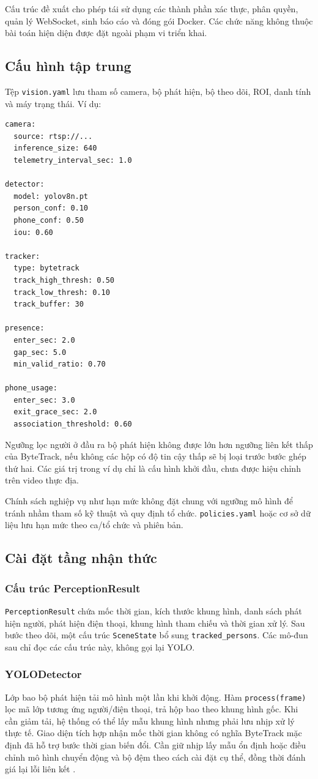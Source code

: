 Cấu trúc đề xuất cho phép tái sử dụng các thành phần xác thực, phân quyền, quản lý WebSocket, sinh báo cáo và đóng gói Docker. Các chức năng không thuộc bài toán hiện diện được đặt ngoài phạm vi triển khai.

\subsection{Cấu hình tập trung}
Tệp \texttt{vision.yaml} lưu tham số camera, bộ phát hiện, bộ theo dõi, ROI, danh tính và máy trạng thái. Ví dụ:
\begin{Verbatim}[fontsize=\small,breaklines=true,breakanywhere=true]
camera:
  source: rtsp://...
  inference_size: 640
  telemetry_interval_sec: 1.0

detector:
  model: yolov8n.pt
  person_conf: 0.10
  phone_conf: 0.50
  iou: 0.60

tracker:
  type: bytetrack
  track_high_thresh: 0.50
  track_low_thresh: 0.10
  track_buffer: 30

presence:
  enter_sec: 2.0
  gap_sec: 5.0
  min_valid_ratio: 0.70

phone_usage:
  enter_sec: 3.0
  exit_grace_sec: 2.0
  association_threshold: 0.60
\end{Verbatim}
Ngưỡng lọc người ở đầu ra bộ phát hiện không được lớn hơn ngưỡng liên kết thấp của ByteTrack, nếu không các hộp có độ tin cậy thấp sẽ bị loại trước bước ghép thứ hai. Các giá trị trong ví dụ chỉ là cấu hình khởi đầu, chưa được hiệu chỉnh trên video thực địa.

Chính sách nghiệp vụ như hạn mức không đặt chung với ngưỡng mô hình để tránh nhầm tham số kỹ thuật và quy định tổ chức. \texttt{policies.yaml} hoặc cơ sở dữ liệu lưu hạn mức theo ca/tổ chức và phiên bản.

\subsection{Cài đặt tầng nhận thức}
\subsubsection{Cấu trúc PerceptionResult}
\texttt{PerceptionResult} chứa mốc thời gian, kích thước khung hình, danh sách phát hiện người, phát hiện điện thoại, khung hình tham chiếu và thời gian xử lý. Sau bước theo dõi, một cấu trúc \texttt{SceneState} bổ sung \texttt{tracked\_persons}. Các mô-đun sau chỉ đọc các cấu trúc này, không gọi lại YOLO.

\subsubsection{YOLODetector}
Lớp bao bộ phát hiện tải mô hình một lần khi khởi động. Hàm \texttt{process(frame)} lọc mã lớp tương ứng người/điện thoại, trả hộp bao theo khung hình gốc. Khi cần giảm tải, hệ thống có thể lấy mẫu khung hình nhưng phải lưu nhịp xử lý thực tế. Giao diện tích hợp nhận mốc thời gian không có nghĩa ByteTrack mặc định đã hỗ trợ bước thời gian biến đổi. Cần giữ nhịp lấy mẫu ổn định hoặc điều chỉnh mô hình chuyển động và bộ đệm theo cách cài đặt cụ thể, đồng thời đánh giá lại lỗi liên kết \cite{ultralyticstrack}.

